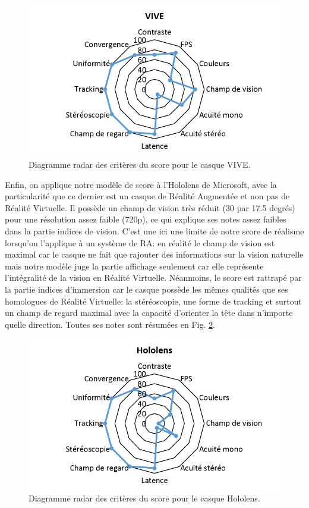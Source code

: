 \begin{figure}
	\renewcommand\thefigure{V}
	\centering
	\includegraphics[scale=1]{Figures/RadarScoreVIVE}
	\caption{Diagramme radar des critères du score pour le casque VIVE.}
	\label{fig:radar_score_vive}
\end{figure}

\par Enfin, on applique notre modèle de score à l'Hololens de Microsoft, avec la particularité que ce dernier est un casque de Réalité Augmentée et non pas de Réalité Virtuelle. Il possède un champ de vision très réduit (30 par 17.5 degrés) pour une résolution assez faible (720p), ce qui explique ses notes assez faibles dans la partie indices de vision. C'est une ici une limite de notre score de réalisme lorsqu'on l'applique à un système de RA: en réalité le champ de vision est maximal car le casque ne fait que rajouter des informations sur la vision naturelle mais notre modèle juge la partie affichage seulement car elle représente l'intégralité de la vision en Réalité Virtuelle. Néanmoins, le score est rattrapé par la partie indices d'immersion car le casque possède les mêmes qualités que ses homologues de Réalité Virtuelle: la stéréoscopie, une forme de tracking et surtout un champ de regard maximal avec la capacité d'orienter la tête dans n'importe quelle direction. Toutes ses notes sont résumées en Fig. \ref{fig:radar_score_hololens}.

\begin{figure}
	\renewcommand\thefigure{VI}
	\centering
	\includegraphics[scale=1]{Figures/RadarScoreHololens}
	\caption{Diagramme radar des critères du score pour le casque Hololens.}
	\label{fig:radar_score_hololens}
\end{figure}

